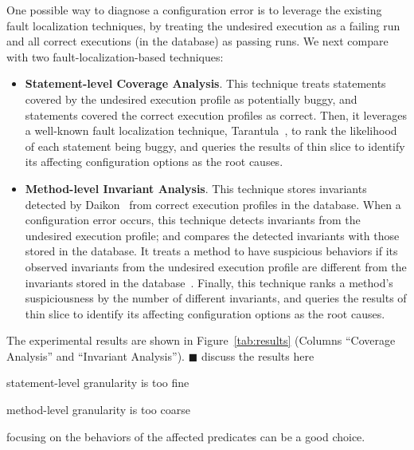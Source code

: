 

One possible way to diagnose a configuration error is to leverage
the existing fault localization techniques, by treating the undesired
execution as a failing run and all correct executions (in the database)
as passing runs. We next compare \ourtool with two fault-localization-based
techniques: %

\begin{itemize}
\item \textbf{Statement-level Coverage Analysis}. This technique treats statements covered
by the undesired execution profile as potentially buggy, and statements
covered the correct execution profiles as correct.
Then, it leverages a well-known fault localization technique,
Tarantula~\cite{Jones:2002}, to rank the likelihood of each
statement being buggy, and queries the results of thin slice
to identify its affecting configuration options as the root causes.

\item \textbf{Method-level Invariant Analysis}. This technique stores invariants detected
by Daikon~\cite{Ernst:1999} from correct execution profiles in the database.
When a configuration error occurs, this technique detects invariants from the undesired execution profile;
and compares the detected invariants with those stored in the database.
It treats a method to have suspicious behaviors if its observed invariants
from the undesired execution profile are different from the invariants stored
in the database~\cite{McCamant:2003}. Finally, this technique ranks a method's suspiciousness by
the number of different invariants, and queries the results of thin slice
to identify its affecting configuration options as the root causes. 
\end{itemize}


The experimental results are shown in Figure~\ref{tab:results} (Columns
``Coverage Analysis'' and ``Invariant Analysis'').
$\blacksquare$ discuss the results here

statement-level granularity is too fine

method-level granularity is too coarse

focusing on the behaviors of the affected predicates can be a good choice.
